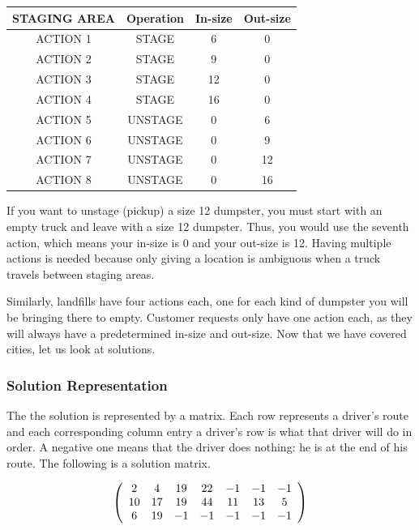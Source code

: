 \documentclass{article}
\begin{document}
\vspace{5mm}
\begin{tabular}{ | c | c | c | c |}
STAGING AREA & Operation & In-size & Out-size \\
\hline ACTION 1 & STAGE & 6 &  0 \\
ACTION 2 & STAGE & 9 &  0 \\
ACTION 3 & STAGE & 12 &  0 \\
ACTION 4 & STAGE & 16 &  0 \\
ACTION 5 & UNSTAGE & 0 &  6 \\
ACTION 6 & UNSTAGE & 0 &  9 \\
ACTION 7 & UNSTAGE & 0 &  12 \\
ACTION 8 & UNSTAGE & 0 &  16 \\
\end{tabular}

\vspace{5mm}



If you want to unstage (pickup) a size 12 dumpster, you must start with an empty truck and leave with a size 12 dumpster.
Thus, you would use the seventh action, which means your in-size is 0 and your out-size is 12.  
Having multiple actions is needed because only giving a location is ambiguous when a truck travels between staging areas.

Similarly, landfills have four actions each, one for each kind of dumpster you will be bringing there to empty.  
Customer requests only have one action each, as they will always have a predetermined in-size and out-size.
Now that we have covered cities, let us look at solutions.


\subsubsection{Solution Representation}

The the solution is represented by a matrix.
Each row represents a driver's route and each corresponding column entry a driver's row is what that driver will do in order.
A negative one means that the driver does nothing: he is at the end of his route.
The following is a solution matrix.

\vspace{5mm}

\[
\left(
\begin{array}{  c  c  c  c  c  c  c }
2 & 4 & 19 & 22 & -1 & -1 & -1  \\
10 & 17 & 19 & 44 & 11 & 13 & 5 \\
6 & 19 & -1 & -1 & -1 & -1 & -1  \\
\end{array} \right)
\]
\end{document}
